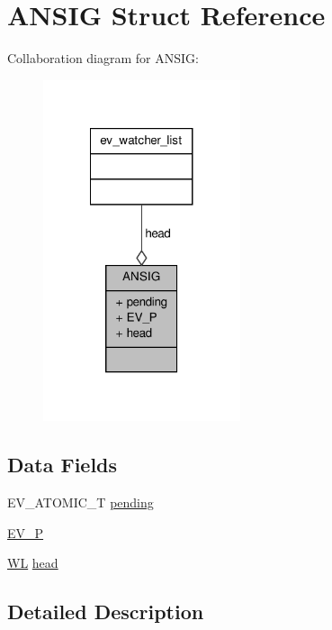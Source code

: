 \hypertarget{struct_a_n_s_i_g}{\section{\-A\-N\-S\-I\-G \-Struct \-Reference}
\label{struct_a_n_s_i_g}
}


\-Collaboration diagram for \-A\-N\-S\-I\-G\-:
\nopagebreak
\begin{figure}[H]
\begin{center}
\leavevmode
\includegraphics[width=164pt]{struct_a_n_s_i_g__coll__graph}
\end{center}
\end{figure}
\subsection*{\-Data \-Fields}
\begin{DoxyCompactItemize}
\item 
\-E\-V\-\_\-\-A\-T\-O\-M\-I\-C\-\_\-\-T \hyperlink{struct_a_n_s_i_g_a63e6db022c8882b3af1efcdd00e5dbd4}{pending}
\item 
\hyperlink{struct_a_n_s_i_g_a2ac4652fbc25ea6c30d7158cfe5e7698}{\-E\-V\-\_\-\-P}
\item 
\hyperlink{ev_8c_a0828ab15b964af31c49b160d210ca60b}{\-W\-L} \hyperlink{struct_a_n_s_i_g_adfe98a723723ae76746a9a793f2bd862}{head}
\end{DoxyCompactItemize}


\subsection{\-Detailed \-Description}


